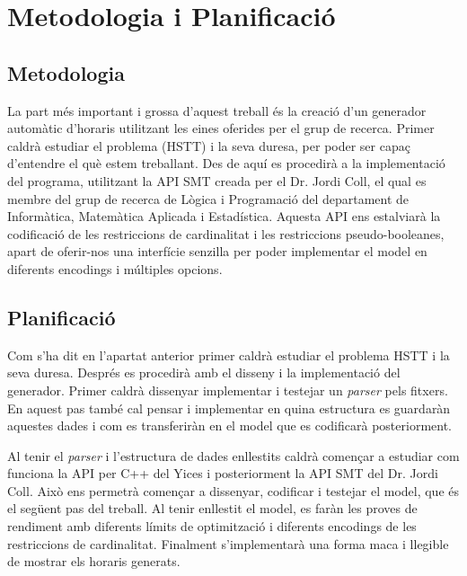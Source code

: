 \documentclass[11pt,a4paper,twoside]{report}
\begin{document}

  \chapter{Metodologia i Planificació}
  \section{Metodologia}
  La part més important i grossa d'aquest treball és la creació d'un generador automàtic d'horaris utilitzant les eines oferides per el grup de recerca. 
  Primer caldrà estudiar el problema (HSTT) i la seva duresa, per poder ser capaç d'entendre el què estem treballant.
  Des de aquí es procedirà a la implementació del programa, utilitzant la API SMT creada per el Dr. Jordi Coll, el qual es membre del grup de recerca de Lògica i Programació del departament de Informàtica, Matemàtica Aplicada i Estadística.
  Aquesta API ens estalviarà la codificació de les restriccions de cardinalitat i les restriccions pseudo-booleanes, 
  apart de oferir-nos una interfície senzilla per poder implementar el model en diferents encodings i múltiples opcions.

  \section{Planificació}

  Com s'ha dit en l'apartat anterior primer caldrà estudiar el problema HSTT i la seva duresa. 
  Després es procedirà amb el disseny i la implementació del generador. Primer caldrà dissenyar implementar i testejar un \textit{parser} pels fitxers. En aquest pas també cal pensar i implementar en quina estructura es guardaràn aquestes dades i com es transferiràn en el model que es codificarà posteriorment. 

  Al tenir el \textit{parser} i l'estructura de dades enllestits caldrà començar a estudiar com funciona la API per C++ del Yices i 
  posteriorment la API SMT del Dr. Jordi Coll. Això ens permetrà començar a dissenyar, codificar i testejar el model, que és el següent pas del treball. 
  Al tenir enllestit el model, es faràn les proves de rendiment amb diferents límits de optimització i diferents encodings de les restriccions de cardinalitat.
  Finalment s'implementarà una forma maca i llegible de mostrar els horaris generats.
  
\end{document}
